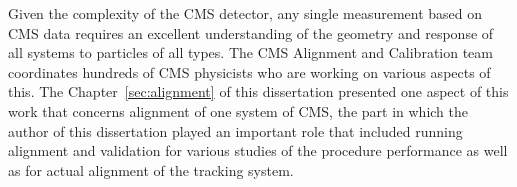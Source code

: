 Given the complexity of the CMS detector, any single measurement based on CMS data requires an excellent understanding of the geometry and response of all systems to particles of all types. The CMS Alignment and Calibration team coordinates hundreds of CMS physicists who are working on various aspects of this. The Chapter~\ref{sec:alignment} of this dissertation presented one aspect of this work that concerns alignment of one system of CMS, the part in which the author of this dissertation played an important role that included running alignment and validation for various studies of the procedure performance as well as for actual alignment of the tracking system.
